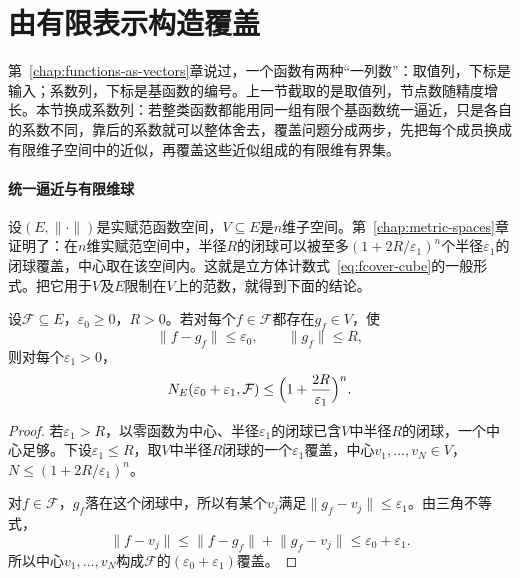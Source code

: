\section{由有限表示构造覆盖}
\label{sec:fcover-finite-representations}

第~\ref{chap:functions-as-vectors}章说过，一个函数有两种“一列数”：取值列，下标是输入；系数列，下标是基函数的编号。上一节截取的是取值列，节点数随精度增长。本节换成系数列：若整类函数都能用同一组有限个基函数统一逼近，只是各自的系数不同，靠后的系数就可以整体舍去，覆盖问题分成两步，先把每个成员换成有限维子空间中的近似，再覆盖这些近似组成的有限维有界集。

\paragraph{统一逼近与有限维球}

设$(E,\lVert\cdot\rVert)$是实赋范函数空间，$V\subseteq E$是$n$维子空间。第~\ref{chap:metric-spaces}章证明了：在$n$维实赋范空间中，半径$R$的闭球可以被至多$(1+2R/\varepsilon_1)^n$个半径$\varepsilon_1$的闭球覆盖，中心取在该空间内。这就是立方体计数式~\eqref{eq:fcover-cube}的一般形式。把它用于$V$及$E$限制在$V$上的范数，就得到下面的结论。

\begin{theorem}[有限维统一逼近给出覆盖]
\label{thm:fcover-finite-dimensional}
设$\mathcal F\subseteq E$，$\varepsilon_0\geq0$，$R>0$。若对每个$f\in\mathcal F$都存在$g_f\in V$，使
\begin{equation}
 \lVert f-g_f\rVert\leq\varepsilon_0,\qquad\lVert g_f\rVert\leq R,
 \label{eq:fcover-uniform-approximation}
\end{equation}
则对每个$\varepsilon_1>0$，
\begin{equation}
 N_E(\varepsilon_0+\varepsilon_1,\mathcal F)\leq\Bigl(1+\frac{2R}{\varepsilon_1}\Bigr)^n .
 \label{eq:fcover-finite-dimensional}
\end{equation}
\end{theorem}

\begin{proof}
若$\varepsilon_1>R$，以零函数为中心、半径$\varepsilon_1$的闭球已含$V$中半径$R$的闭球，一个中心足够。下设$\varepsilon_1\leq R$，取$V$中半径$R$闭球的一个$\varepsilon_1$覆盖，中心$v_1,\ldots,v_N\in V$，$N\leq(1+2R/\varepsilon_1)^n$。

对$f\in\mathcal F$，$g_f$落在这个闭球中，所以有某个$v_j$满足$\lVert g_f-v_j\rVert\leq\varepsilon_1$。由三角不等式，
\[
 \lVert f-v_j\rVert\leq\lVert f-g_f\rVert+\lVert g_f-v_j\rVert\leq\varepsilon_0+\varepsilon_1 .
\]
所以中心$v_1,\ldots,v_N$构成$\mathcal F$的$(\varepsilon_0+\varepsilon_1)$覆盖。
\end{proof}


